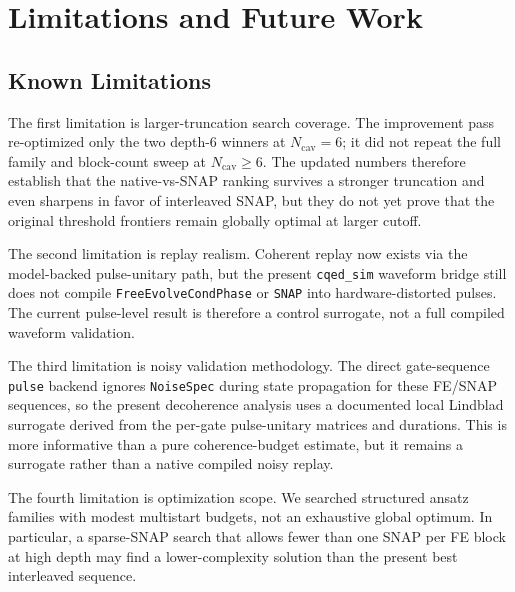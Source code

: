 \documentclass[aps,pra,twocolumn,reprint,amsmath,amssymb]{revtex4-2}
\begin{document}
\section{Limitations and Future Work}
\subsection{Known Limitations}
The first limitation is larger-truncation search coverage. The improvement pass
re-optimized only the two depth-6 winners at $N_{\mathrm{cav}}=6$; it did not
repeat the full family and block-count sweep at $N_{\mathrm{cav}}\geq 6$.
The updated numbers therefore establish that the native-vs-SNAP ranking
survives a stronger truncation and even sharpens in favor of interleaved SNAP,
but they do not yet prove that the original threshold frontiers remain globally
optimal at larger cutoff.

The second limitation is replay realism. Coherent replay now exists via the
model-backed pulse-unitary path, but the present \texttt{cqed\_sim} waveform
bridge still does not compile \texttt{FreeEvolveCondPhase} or \texttt{SNAP}
into hardware-distorted pulses. The current pulse-level result is therefore a
control surrogate, not a full compiled waveform validation.

The third limitation is noisy validation methodology. The direct gate-sequence
\texttt{pulse} backend ignores \texttt{NoiseSpec} during state propagation for
these FE/SNAP sequences, so the present decoherence analysis uses a documented
local Lindblad surrogate derived from the per-gate pulse-unitary matrices and
durations. This is more informative than a pure coherence-budget estimate, but
it remains a surrogate rather than a native compiled noisy replay.

The fourth limitation is optimization scope. We searched structured ansatz
families with modest multistart budgets, not an exhaustive global optimum. In
particular, a sparse-SNAP search that allows fewer than one SNAP per FE block at
high depth may find a lower-complexity solution than the present best
interleaved sequence.
\end{document}
